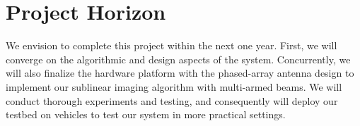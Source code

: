 
\vspace{-4mm}
\section{Project Horizon}
\vspace{-2mm}

We envision to complete this project within the next one year. First, we will converge on the algorithmic and design aspects of the system. Concurrently, we will also finalize the hardware platform with the phased-array antenna design to implement our sublinear imaging algorithm with multi-armed beams. We will conduct thorough experiments and testing, and consequently will deploy our testbed on vehicles to test our system in more practical settings.